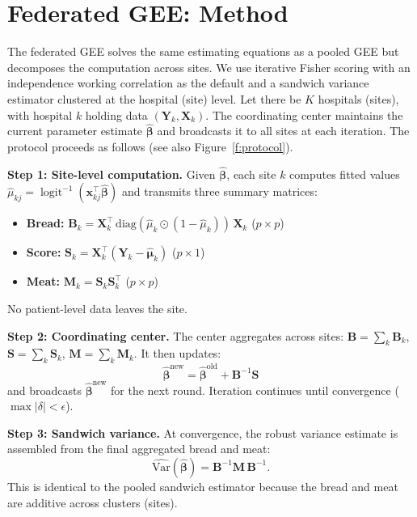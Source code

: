 \documentclass[useAMS,referee]{biom}
\DeclareMathOperator{\logit}{logit}
\begin{document}
\section{Federated GEE: Method}
\label{s:method}

The federated GEE solves the same estimating equations as a pooled GEE but decomposes the computation across sites. We use iterative Fisher scoring with an independence working correlation as the default and a sandwich variance estimator clustered at the hospital (site) level. Let there be $K$ hospitals (sites), with hospital $k$ holding data $(\mathbf{Y}_k, \mathbf{X}_k)$. The coordinating center maintains the current parameter estimate $\hat{\boldsymbol{\beta}}$ and broadcasts it to all sites at each iteration. The protocol proceeds as follows (see also Figure~\ref{f:protocol}).

\noindent\textbf{Step 1: Site-level computation.} Given $\hat{\boldsymbol{\beta}}$, each site $k$ computes fitted values $\hat{\mu}_{kj} = \logit^{-1}(\mathbf{x}_{kj}^{\top} \hat{\boldsymbol{\beta}})$ and transmits three summary matrices:
\begin{itemize}
\item \textbf{Bread:} $\mathbf{B}_k = \mathbf{X}_k^{\top} \, \mbox{diag}(\hat{\mu}_k \odot (1 - \hat{\mu}_k)) \, \mathbf{X}_k$ \quad ($p \times p$)
\item \textbf{Score:} $\mathbf{S}_k = \mathbf{X}_k^{\top} (\mathbf{Y}_k - \hat{\boldsymbol{\mu}}_k)$ \quad ($p \times 1$)
\item \textbf{Meat:} $\mathbf{M}_k = \mathbf{S}_k \mathbf{S}_k^{\top}$ \quad ($p \times p$)
\end{itemize}
No patient-level data leaves the site.

\medskip
\noindent\textbf{Step 2: Coordinating center.} The center aggregates across sites: $\mathbf{B} = \sum_k \mathbf{B}_k$, $\mathbf{S} = \sum_k \mathbf{S}_k$, $\mathbf{M} = \sum_k \mathbf{M}_k$. It then updates:
\begin{equation}
\hat{\boldsymbol{\beta}}^{\text{new}} = \hat{\boldsymbol{\beta}}^{\text{old}} + \mathbf{B}^{-1} \mathbf{S}
\label{eq:update}
\end{equation}
and broadcasts $\hat{\boldsymbol{\beta}}^{\text{new}}$ for the next round. Iteration continues until convergence ($\max |\delta| < \epsilon$).

\medskip
\noindent\textbf{Step 3: Sandwich variance.} At convergence, the robust variance estimate is assembled from the final aggregated bread and meat:
\begin{equation}
\widehat{\mbox{Var}}(\hat{\boldsymbol{\beta}}) = \mathbf{B}^{-1} \mathbf{M} \, \mathbf{B}^{-1}.
\label{eq:sandwich}
\end{equation}
This is identical to the pooled sandwich estimator because the bread and meat are additive across clusters (sites).
\end{document}
